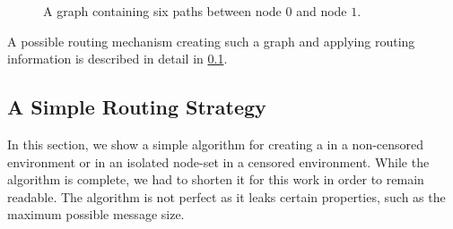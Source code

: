 \begin{figure*}[ht]
	\centering
	\resizebox{.9\linewidth}{!}{
		
	}
	\caption{A graph containing six paths between node $0$ and node $1$.}\label{fig:graphPaths}
\end{figure*}

A possible routing mechanism creating such a graph and applying routing information is described in detail in \cref{sec:simpleRoutingStrategy}.

\subsection{A Simple Routing Strategy}\label{sec:simpleRoutingStrategy}
In this section, we show a simple algorithm for creating a  in a non-censored environment or in an isolated node-set in a censored environment. While the algorithm is complete, we had to shorten it for this work in order to remain readable. The algorithm is not perfect as it leaks certain properties, such as the maximum possible message size.

